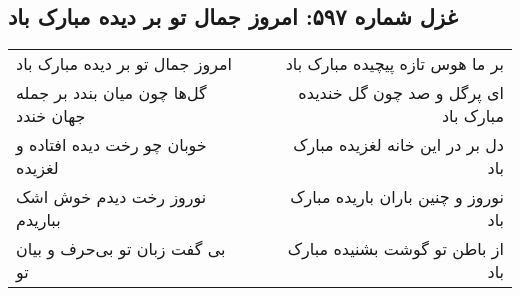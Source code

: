 \begin{center}
\section*{غزل شماره ۵۹۷: امروز جمال تو بر دیده مبارک باد}
\label{sec:0597}
\begin{longtable}{l p{0.5cm} r}
امروز جمال تو بر دیده مبارک باد
&&
بر ما هوس تازه پیچیده مبارک باد
\\
گل‌ها چون میان بندد بر جمله جهان خندد
&&
ای پرگل و صد چون گل خندیده مبارک باد
\\
خوبان چو رخت دیده افتاده و لغزیده
&&
دل بر در این خانه لغزیده مبارک باد
\\
نوروز رخت دیدم خوش اشک بباریدم
&&
نوروز و چنین باران باریده مبارک باد
\\
بی گفت زبان تو بی‌حرف و بیان تو
&&
از باطن تو گوشت بشنیده مبارک باد
\\
\end{longtable}
\end{center}
